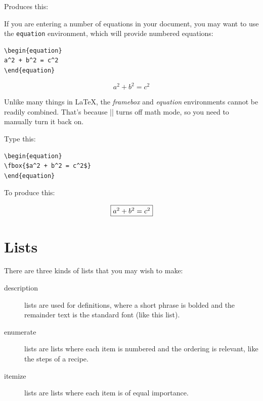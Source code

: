 Produces this:

\begin{center}
\end{center}

If you are entering a number of equations in your document, you may
want to use the \texttt{equation} environment, which will provide
numbered equations:

\begin{Verbatim}
\begin{equation}
a^2 + b^2 = c^2
\end{equation}
\end{Verbatim}
\begin{equation}
a^2 + b^2 = c^2
\end{equation}

Unlike many things in \LaTeX, the \emph{framebox} and \emph{equation}
environments cannot be readily combined. That's because |\fbox| turns
off math mode, so you need to manually turn it back on.

Type this:

\begin{Verbatim}
\begin{equation}
\fbox{$a^2 + b^2 = c^2$}
\end{equation}
\end{Verbatim}


To produce this:

\begin{equation}
\fbox{$a^2 + b^2 = c^2$}
\end{equation}



\section{Lists}

There are three kinds of lists that you may wish to make:

\begin{description}
\item[description] lists are used for definitions, where a  short phrase is bolded and the remainder text is the standard font (like this list).
 \item[enumerate] lists are lists where each item is numbered and the
  ordering is relevant, like the steps of a recipe. 
\item[itemize] lists are lists where each item is of equal
  importance.
\end{description}

